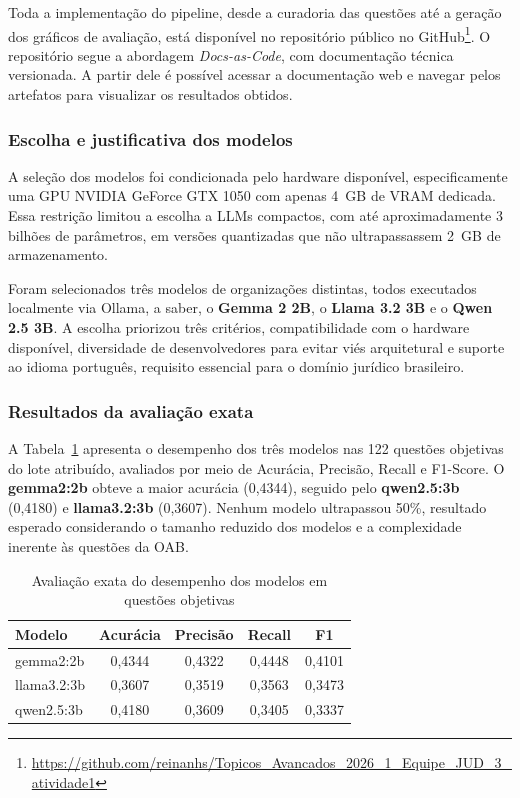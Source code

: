 \documentclass[12pt,a4paper]{article}
\begin{document}
Toda a implementação do pipeline, desde a curadoria das questões até a geração dos gráficos de avaliação, está disponível no repositório público no GitHub\footnote{\url{https://github.com/reinanhs/Topicos_Avancados_2026_1_Equipe_JUD_3_atividade1}}. O repositório segue a abordagem \textit{Docs-as-Code}, com documentação técnica versionada. A partir dele é possível acessar a documentação web e navegar pelos artefatos para visualizar os resultados obtidos.

\subsubsection{Escolha e justificativa dos modelos}

A seleção dos modelos foi condicionada pelo hardware disponível, especificamente uma GPU NVIDIA GeForce GTX 1050 com apenas 4~GB de VRAM dedicada. Essa restrição limitou a escolha a LLMs compactos, com até aproximadamente 3 bilhões de parâmetros, em versões quantizadas que não ultrapassassem 2~GB de armazenamento.

Foram selecionados três modelos de organizações distintas, todos executados localmente via Ollama, a saber, o \textbf{Gemma 2 2B}, o \textbf{Llama 3.2 3B} e o \textbf{Qwen 2.5 3B}. A escolha priorizou três critérios, compatibilidade com o hardware disponível, diversidade de desenvolvedores para evitar viés arquitetural e suporte ao idioma português, requisito essencial para o domínio jurídico brasileiro.

\subsubsection{Resultados da avaliação exata}

A Tabela~\ref{tab:reinan-exata} apresenta o desempenho dos três modelos nas 122 questões objetivas do lote atribuído, avaliados por meio de Acurácia, Precisão, Recall e F1-Score. O \textbf{gemma2:2b} obteve a maior acurácia (0,4344), seguido pelo \textbf{qwen2.5:3b} (0,4180) e \textbf{llama3.2:3b} (0,3607). Nenhum modelo ultrapassou 50\%, resultado esperado considerando o tamanho reduzido dos modelos e a complexidade inerente às questões da OAB.

\begin{table}[H]
\centering
\caption{Avaliação exata do desempenho dos modelos em questões objetivas}
\label{tab:reinan-exata}
\begin{tabular}{lcccc}
\toprule
\textbf{Modelo} & \textbf{Acurácia} & \textbf{Precisão} & \textbf{Recall} & \textbf{F1} \\
\midrule
gemma2:2b   & 0,4344 & 0,4322 & 0,4448 & 0,4101 \\
llama3.2:3b & 0,3607 & 0,3519 & 0,3563 & 0,3473 \\
qwen2.5:3b  & 0,4180 & 0,3609 & 0,3405 & 0,3337 \\
\bottomrule
\end{tabular}
\end{table}
\end{document}
